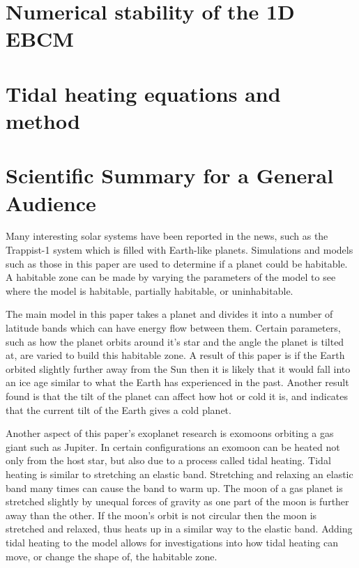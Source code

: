 \documentclass[12pt, onecolumn]{revtex4-2}    %
\begin{document}
\section{Numerical stability of the 1D EBCM} \label{appx:NumStability}

\section{Tidal heating equations and method} \label{appx:TidalHeatingEquationsMethod}

\clearpage

\section*{Scientific Summary for a General Audience}

Many interesting solar systems have been reported in the news, such as the Trappist-1 system which is filled with Earth-like planets.
Simulations and models such as those in this paper are used to determine if a planet could be habitable.
A habitable zone can be made by varying the parameters of the model to see where the model is habitable, partially habitable, or uninhabitable.

The main model in this paper takes a planet and divides it into a number of latitude bands which can have energy flow between them.
Certain parameters, such as how the planet orbits around it's star and the angle the planet is tilted at, are varied to build this habitable zone.
A result of this paper is if the Earth orbited slightly further away from the Sun then it is likely that it would fall into an ice age similar to what the Earth has experienced in the past.
Another result found is that the tilt of the planet can affect how hot or cold it is, and indicates that the current tilt of the Earth gives a cold planet.

Another aspect of this paper's exoplanet research is exomoons orbiting a gas giant such as Jupiter.
In certain configurations an exomoon can be heated not only from the host star, but also due to a process called tidal heating.
Tidal heating is similar to stretching an elastic band.
Stretching and relaxing an elastic band many times can cause the band to warm up.
The moon of a gas planet is stretched slightly by unequal forces of gravity as one part of the moon is further away than the other.
If the moon's orbit is not circular then the moon is stretched and relaxed, thus heats up in a similar way to the elastic band.
Adding tidal heating to the model allows for investigations into how tidal heating can move, or change the shape of, the habitable zone.
\end{document}
